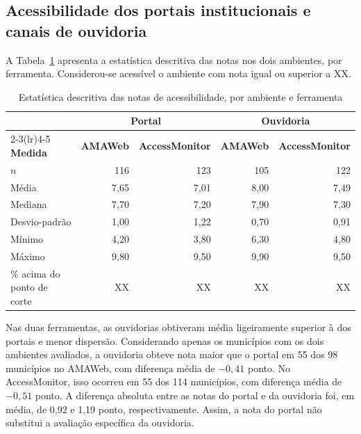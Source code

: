 \documentclass[12pt]{article}
\begin{document}
\subsection{Acessibilidade dos portais institucionais e canais de ouvidoria}

A Tabela~\ref{tab:descritiva} apresenta a estatística descritiva das notas nos dois ambientes, por ferramenta. Considerou-se acessível o ambiente com nota igual ou superior a XX. %

\begin{table}[H]
\centering
\caption{Estatística descritiva das notas de acessibilidade, por ambiente e ferramenta}
\label{tab:descritiva}
\small
\begin{tabular}{lrrrr}
\toprule
 & \multicolumn{2}{c}{\textbf{Portal}} & \multicolumn{2}{c}{\textbf{Ouvidoria}} \\
\cmidrule(lr){2-3}\cmidrule(lr){4-5}
\textbf{Medida} & \textbf{AMAWeb} & \textbf{AccessMonitor} & \textbf{AMAWeb} & \textbf{AccessMonitor} \\
\midrule
$n$                          &  116 &  123 &  105 &  122 \\
Média                        & 7,65 & 7,01 & 8,00 & 7,49 \\
Mediana                      & 7,70 & 7,20 & 7,90 & 7,30 \\
Desvio-padrão                & 1,00 & 1,22 & 0,70 & 0,91 \\
Mínimo                       & 4,20 & 3,80 & 6,30 & 4,80 \\
Máximo                       & 9,80 & 9,50 & 9,90 & 9,50 \\
\% acima do ponto de corte   &   XX &   XX &   XX &   XX \\
\bottomrule
\end{tabular}
\end{table}


Nas duas ferramentas, as ouvidorias obtiveram média ligeiramente superior à dos portais e menor dispersão. Considerando apenas os municípios com os dois ambientes avaliados, a ouvidoria obteve nota maior que o portal em 55 dos 98 municípios no AMAWeb, com diferença média de $-0{,}41$ ponto. No AccessMonitor, isso ocorreu em 55 dos 114 municípios, com diferença média de $-0{,}51$ ponto. A diferença absoluta entre as notas do portal e da ouvidoria foi, em média, de 0,92 e 1,19 ponto, respectivamente. Assim, a nota do portal não substitui a avaliação específica da ouvidoria.
\end{document}
